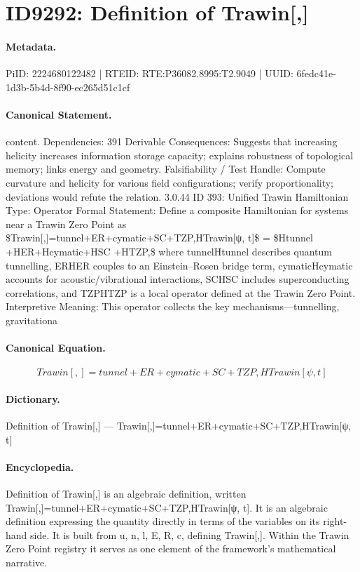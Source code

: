 \section*{ID9292: Definition of Trawin[,]}
\paragraph{Metadata.}
PiID: 2224680122482 | RTEID: RTE:P36082.8995:T2.9049 | UUID: 6fedc41e-1d3b-5b4d-8f90-ec265d51c1cf

\paragraph{Canonical Statement.}
content. Dependencies: 391 Derivable Consequences: Suggests that increasing helicity increases information storage capacity; explains robustness of topological memory; links energy and geometry. Falsifiability / Test Handle: Compute curvature and helicity for various field configurations; verify proportionality; deviations would refute the relation. 3.0.44 ID 393: Unified Trawin Hamiltonian Type: Operator Formal Statement: Define a composite Hamiltonian for systems near a Trawin Zero Point as \$Trawin[,]=tunnel+ER+cymatic+SC+TZP,HTrawin[ψ, t]\$ = \$Htunnel +HER+Hcymatic+HSC +HTZP,\$ where tunnelHtunnel describes quantum tunnelling, ERHER couples to an Einstein–Rosen bridge term, cymaticHcymatic accounts for acoustic/vibrational interactions, SCHSC includes superconducting correlations, and TZPHTZP is a local operator defined at the Trawin Zero Point. Interpretive Meaning: This operator collects the key mechanisms—tunnelling, gravitationa

\paragraph{Canonical Equation.}
\[
Trawin[,]=tunnel+ER+cymatic+SC+TZP,HTrawin[ψ, t]
\]

\paragraph{Dictionary.}
Definition of Trawin[,] — Trawin[,]=tunnel+ER+cymatic+SC+TZP,HTrawin[ψ, t]

\paragraph{Encyclopedia.}
Definition of Trawin[,] is an algebraic definition, written Trawin[,]=tunnel+ER+cymatic+SC+TZP,HTrawin[ψ, t]. It is an algebraic definition expressing the quantity directly in terms of the variables on its right-hand side. It is built from u, n, l, E, R, c, defining Trawin[,]. Within the Trawin Zero Point registry it serves as one element of the framework's mathematical narrative.

